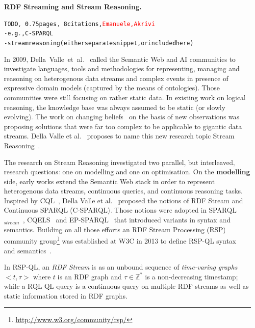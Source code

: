 \textbf{RDF Streaming and Stream Reasoning.}
\begin{alltt}TODO\scriptsize, ~0.75 pages, ~8 citations, \textcolor{red}{Emanuele, Akrivi}
- e.g., C-SPARQL \cite{barbieri_et_al_2009}
- stream reasoning (either separate snippet, or included here)
\end{alltt}

In 2009, Della~Valle~et~al.~\cite{DBLP:journals/expert/ValleCHF09} called the Semantic Web and AI communities to investigate languages, tools and methodologies for representing, managing and reasoning on heterogenous data streams and complex events in presence of expressive domain models (captured by the means of ontologies). Those communities were still focusing on rather static data. In existing work on logical reasoning, the knowledge base was always assumed to be static (or slowly evolving). The work on changing beliefs~\cite{583243} on the basis of new observations was proposing solutions that were far too complex to be applicable to gigantic data streams. Della Valle et al.~\cite{DBLP:journals/expert/ValleCHF09} proposes to name this new research topic Stream Reasoning~\cite{DellAglioDataScience2017}.

\sloppy The research on Stream Reasoning investigated two parallel, but interleaved, research questions: one on modelling and one on optimisation. On the \textbf{modelling} side, early works extend the Semantic Web stack \cite{DBLP:books/daglib/0036180} in order to represent heterogenous data streams, continuous queries, and continuous reasoning tasks. Inspired by CQL~\cite{arasu_widom_2004}, Della Valle et al.~\cite{DBLP:conf/fis/ValleCBBC08} proposed the notions of RDF Stream and Continuous SPARQL (C-SPARQL). Those notions were adopted in SPARQL$_{stream}$~\cite{Calbimonte2010}, CQELS~\cite{LePhuoc2012c} and EP-SPARQL~\cite{DBLP:journals/semweb/AnicicRFS12} that introduced variants in syntax and semantics. Building on all those efforts an RDF Stream Processing (RSP) community group\footnote{\url{http://www.w3.org/community/rsp/}} was established at W3C in 2013  to define RSP-QL syntax~\cite{DBLP:conf/esws/DellAglioCVC15} and semantics~\cite{DBLP:journals/ijswis/DellAglioVCC14}.

In RSP-QL, an \textit{RDF Stream} is as an unbound sequence of \emph{time-varing graphs} $< t,\tau>$ where $t$ is an RDF graph and $\tau \in \mathbb{Z}^{*}$ is a non-decreasing timestamp; while a RQL-QL query is a continuous query on multiple RDF streams as well as static information stored in RDF graphs. 

